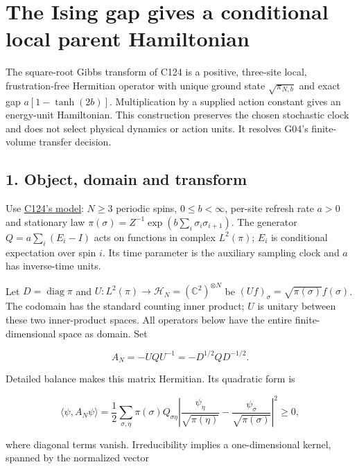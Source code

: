 \documentclass[11pt,a4paper]{article}
\begin{document}
\hypertarget{the-ising-gap-gives-a-conditional-local-parent-hamiltonian}{%
\section{The Ising gap gives a conditional local parent
Hamiltonian}\label{the-ising-gap-gives-a-conditional-local-parent-hamiltonian}}

The square-root Gibbs transform of C124 is a positive, three-site local,
frustration-free Hermitian operator with unique ground state
\(\sqrt{\pi_{N,b}}\) and exact gap \(a[1-\tanh(2b)]\). Multiplication by
a supplied action constant gives an energy-unit Hamiltonian. This
construction preserves the chosen stochastic clock and does not select
physical dynamics or action units. It resolves G04's finite-volume
transfer decision.

\hypertarget{object-domain-and-transform}{%
\subsection{1. Object, domain and
transform}\label{object-domain-and-transform}}

Use \href{interacting-ising-gap.md}{C124's model}: \(N\ge3\) periodic
spins, \(0\le b<\infty\), per-site refresh rate \(a>0\) and stationary
law \(\pi(\sigma)=Z^{-1}\exp(b\sum_i\sigma_i\sigma_{i+1})\). The
generator \(Q=a\sum_i(E_i-I)\) acts on functions in complex
\(L^2(\pi)\); \(E_i\) is conditional expectation over spin \(i\). Its
time parameter is the auxiliary sampling clock and \(a\) has
inverse-time units.

Let \(D=\operatorname{diag}\pi\) and
\(U:L^2(\pi)\to\mathcal H_N=(\mathbb C^2)^{\otimes N}\) be
\((Uf)_\sigma=\sqrt{\pi(\sigma)}f(\sigma)\). The codomain has the
standard counting inner product; \(U\) is unitary between these two
inner-product spaces. All operators below have the entire
finite-dimensional space as domain. Set

\[
A_N=-UQU^{-1}=-D^{1/2}QD^{-1/2}.
\]

Detailed balance makes this matrix Hermitian. Its quadratic form is

\[
\langle\psi,A_N\psi\rangle
=\frac12\sum_{\sigma,\eta}\pi(\sigma)Q_{\sigma\eta}
\left|\frac{\psi_\eta}{\sqrt{\pi(\eta)}}-
      \frac{\psi_\sigma}{\sqrt{\pi(\sigma)}}\right|^2\ge0,
\]

where diagonal terms vanish. Irreducibility implies a one-dimensional
kernel, spanned by the normalized vector
\end{document}
